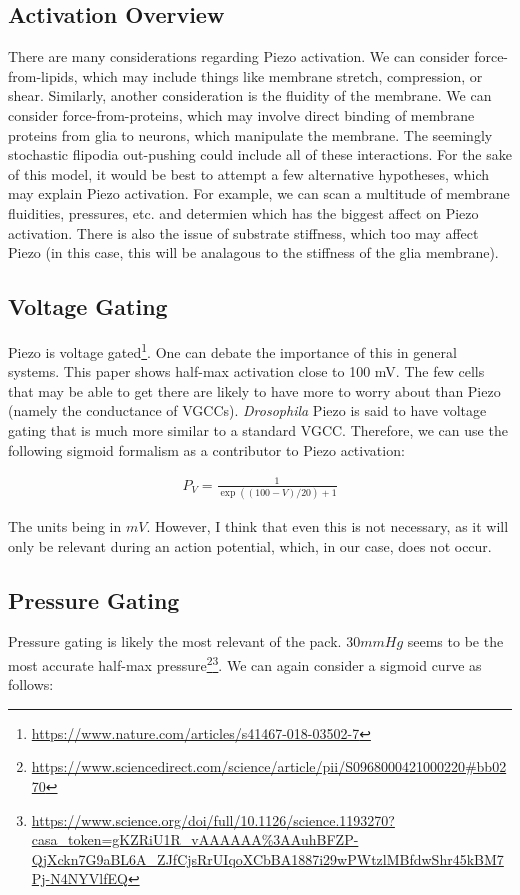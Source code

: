 \documentclass[12pt]{amsart}
\newcommand{\pr}[1]{\left(#1\right)}
\begin{document}
\subsection{Activation Overview} There are many considerations regarding Piezo activation. We can consider force-from-lipids, which may include things like membrane stretch, compression, or shear. Similarly, another consideration is the fluidity of the membrane. We can consider force-from-proteins, which may involve direct binding of membrane proteins from glia to neurons, which manipulate the membrane. The seemingly stochastic flipodia out-pushing could include all of these interactions. For the sake of this model, it would be best to attempt a few alternative hypotheses, which may explain Piezo activation. For example, we can scan a multitude of membrane fluidities, pressures, etc. and determien which has the biggest affect on Piezo activation. There is also the issue of substrate stiffness, which too may affect Piezo (in this case, this will be analagous to the stiffness of the glia membrane).\newline 

\subsection{Voltage Gating} Piezo is voltage gated\footnote{\url{https://www.nature.com/articles/s41467-018-03502-7}}. One can debate the importance of this in general systems. This paper shows half-max activation close to 100 mV. The few cells that may be able to get there are likely to have more to worry about than Piezo (namely the conductance of VGCCs). \textit{Drosophila} Piezo is said to have voltage gating that is much more similar to a standard VGCC. Therefore, we can use the following sigmoid formalism as a contributor to Piezo activation: 

\bigskip


\begin{equation} \label{eq8}
\begin{split}
P_V = \frac{1}{\exp\pr{\pr{100 - V}/20} + 1}
\end{split}
\end{equation}

\bigskip

The units being in $mV$. However, I think that even this is not necessary, as it will only be relevant during an action potential, which, in our case, does not occur. 

\subsection{Pressure Gating} Pressure gating is likely the most relevant of the pack. $30mmHg$ seems to be the most accurate half-max pressure\footnote{\url{https://www.sciencedirect.com/science/article/pii/S0968000421000220\#bb0270}}\footnote{\url{https://www.science.org/doi/full/10.1126/science.1193270?casa_token=gKZRiU1R_vAAAAAA\%3AAuhBFZP-QjXckn7G9aBL6A_ZJfCjsRrUIqoXCbBA1887i29wPWtzlMBfdwShr45kBM7Pj-N4NYVlfEQ}}. We can again consider a sigmoid curve as follows: 
\end{document}
